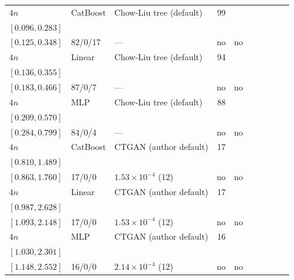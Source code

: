 \begin{longtable}{@{}ll>{\raggedright\arraybackslash}p{1.1in}rllrlll@{}}
$4n$ & CatBoost & Chow-Liu tree (default) & 99 & \begin{tabular}[t]{@{}l@{}}$0.211$\\\tiny$[0.096, 0.283]$\end{tabular} & \begin{tabular}[t]{@{}l@{}}$0.230$\\\tiny$[0.125, 0.348]$\end{tabular} & 82/0/17 & --- & no & no \\
$4n$ & Linear & Chow-Liu tree (default) & 94 & \begin{tabular}[t]{@{}l@{}}$0.259$\\\tiny$[0.136, 0.355]$\end{tabular} & \begin{tabular}[t]{@{}l@{}}$0.317$\\\tiny$[0.183, 0.466]$\end{tabular} & 87/0/7 & --- & no & no \\
$4n$ & MLP & Chow-Liu tree (default) & 88 & \begin{tabular}[t]{@{}l@{}}$0.394$\\\tiny$[0.209, 0.570]$\end{tabular} & \begin{tabular}[t]{@{}l@{}}$0.489$\\\tiny$[0.284, 0.799]$\end{tabular} & 84/0/4 & --- & no & no \\
$4n$ & CatBoost & CTGAN (author default) & 17 & \begin{tabular}[t]{@{}l@{}}$0.978$\\\tiny$[0.810, 1.489]$\end{tabular} & \begin{tabular}[t]{@{}l@{}}$1.097$\\\tiny$[0.863, 1.760]$\end{tabular} & 17/0/0 & $1.53\times 10^{-4}$ (12) & no & no \\
$4n$ & Linear & CTGAN (author default) & 17 & \begin{tabular}[t]{@{}l@{}}$1.277$\\\tiny$[0.987, 2.628]$\end{tabular} & \begin{tabular}[t]{@{}l@{}}$1.463$\\\tiny$[1.093, 2.148]$\end{tabular} & 17/0/0 & $1.53\times 10^{-4}$ (12) & no & no \\
$4n$ & MLP & CTGAN (author default) & 16 & \begin{tabular}[t]{@{}l@{}}$1.454$\\\tiny$[1.030, 2.301]$\end{tabular} & \begin{tabular}[t]{@{}l@{}}$1.541$\\\tiny$[1.148, 2.552]$\end{tabular} & 16/0/0 & $2.14\times 10^{-4}$ (12) & no & no \\

\end{longtable}
